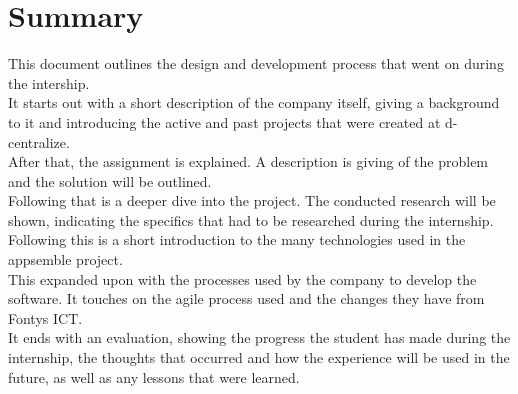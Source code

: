 \chapter{Summary}
This document outlines the design and development process that went on during the intership. \\

It starts out with a short description of the company itself, giving a background to it and introducing the active and past projects that were created at d-centralize. \\

After that, the assignment is explained. A description is giving of the problem and the solution will be outlined. \\

Following that is a deeper dive into the project. The conducted research will be shown, indicating the specifics that had to be researched during the internship. Following this is  a short introduction to the many technologies used in the appsemble project. \\ 

This expanded upon with the processes used by the company to develop the software. It touches on the agile process used and the changes they have from Fontys ICT. \\

It ends with an evaluation, showing the progress the student has made during the internship, the thoughts that occurred and how the experience will be used in the future, as well as any lessons that were learned.